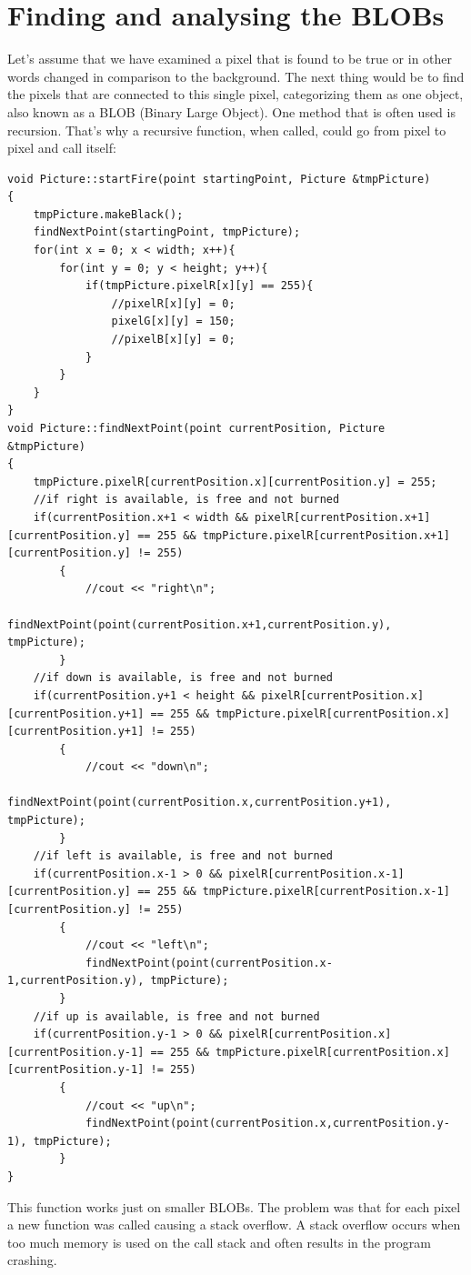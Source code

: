 \section{Finding and analysing the BLOBs}
Let's assume that we have examined a pixel that is found to be true or in other words changed in comparison to the background. The next thing would be to find the pixels that are connected to this single pixel, categorizing them as one object, also known as a BLOB (Binary Large Object). One method that is often used is recursion. That's why a recursive function, when called, could go from pixel to pixel and call itself:
\begin{lstlisting}
void Picture::startFire(point startingPoint, Picture &tmpPicture)
{
	tmpPicture.makeBlack();
	findNextPoint(startingPoint, tmpPicture);
	for(int x = 0; x < width; x++){
		for(int y = 0; y < height; y++){
			if(tmpPicture.pixelR[x][y] == 255){ 
				//pixelR[x][y] = 0;
				pixelG[x][y] = 150;
				//pixelB[x][y] = 0;
			}
		}
	}
}
void Picture::findNextPoint(point currentPosition, Picture &tmpPicture)
{
	tmpPicture.pixelR[currentPosition.x][currentPosition.y] = 255;
	//if right is available, is free and not burned
	if(currentPosition.x+1 < width && pixelR[currentPosition.x+1][currentPosition.y] == 255 && tmpPicture.pixelR[currentPosition.x+1][currentPosition.y] != 255)
		{
			//cout << "right\n";
			findNextPoint(point(currentPosition.x+1,currentPosition.y), tmpPicture);
		}
	//if down is available, is free and not burned
	if(currentPosition.y+1 < height && pixelR[currentPosition.x][currentPosition.y+1] == 255 && tmpPicture.pixelR[currentPosition.x][currentPosition.y+1] != 255)
		{
			//cout << "down\n";
			findNextPoint(point(currentPosition.x,currentPosition.y+1), tmpPicture);
		}
	//if left is available, is free and not burned
	if(currentPosition.x-1 > 0 && pixelR[currentPosition.x-1][currentPosition.y] == 255 && tmpPicture.pixelR[currentPosition.x-1][currentPosition.y] != 255)
		{
			//cout << "left\n";
			findNextPoint(point(currentPosition.x-1,currentPosition.y), tmpPicture);
		}
	//if up is available, is free and not burned
	if(currentPosition.y-1 > 0 && pixelR[currentPosition.x][currentPosition.y-1] == 255 && tmpPicture.pixelR[currentPosition.x][currentPosition.y-1] != 255)
		{
			//cout << "up\n";
			findNextPoint(point(currentPosition.x,currentPosition.y-1), tmpPicture);
		}
}
\end{lstlisting}
This function works just on smaller BLOBs. The problem was that for each pixel a new function was called causing a stack overflow. A stack overflow occurs when too much memory is used on the call stack and often results in the program crashing.

